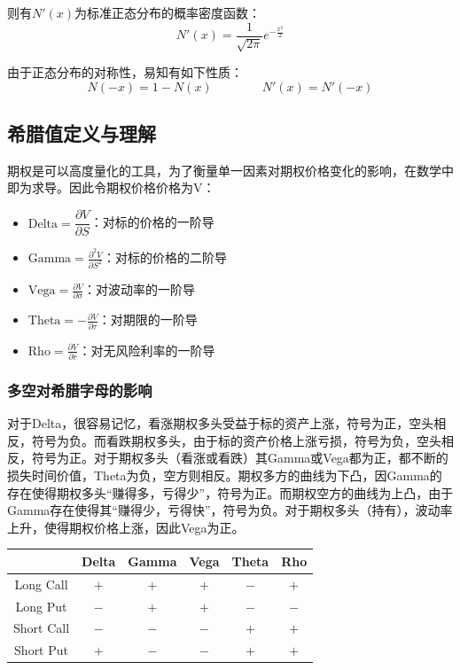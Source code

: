 \documentclass[11pt]{article}
\begin{document}
则有$N'(x)$为标准正态分布的概率密度函数：
\begin{equation*}
    N'(x) = \frac{1}{\sqrt{2\pi}} e^{-\frac{x^2}{2}}
\end{equation*}

由于正态分布的对称性，易知有如下性质：
\begin{equation*}
    N(-x) = 1-N(x) \qquad \qquad
    N'(x) = N'(-x)
\end{equation*}

\subsection{希腊值定义与理解}

期权是可以高度量化的工具，为了衡量单一因素对期权价格变化的影响，在数学中即为求导。因此令期权价格价格为V：
\begin{itemize}
    \item $\text{Delta} = \dfrac{\partial V}{\partial S}$：对标的价格的一阶导
    \item $\text{Gamma}  = \frac{\partial^2 V}{\partial S^2}$：对标的价格的二阶导
    \item $\text{Vega} = \frac{\partial V}{\partial\sigma}$：对波动率的一阶导
    \item $\text{Theta} = -\frac{\partial V}{\partial \tau}$：对期限的一阶导
    \item $\text{Rho} = \frac{\partial V}{\partial r}$：对无风险利率的一阶导
\end{itemize}

\subsubsection{多空对希腊字母的影响}

对于Delta，很容易记忆，看涨期权多头受益于标的资产上涨，符号为正，空头相反，符号为负。而看跌期权多头，由于标的资产价格上涨亏损，符号为负，空头相反，符号为正。对于期权多头（看涨或看跌）其Gamma或Vega都为正，都不断的损失时间价值，Theta为负，空方则相反。期权多方的曲线为下凸，因Gamma的存在使得期权多头“赚得多，亏得少”，符号为正。而期权空方的曲线为上凸，由于Gamma存在使得其“赚得少，亏得快”，符号为负。对于期权多头（持有），波动率上升，使得期权价格上涨，因此Vega为正。
\begin{table}[H]
\centering
\begin{tabular}{@{}cccccc@{}} \toprule
           & Delta & Gamma & Vega & Theta & Rho \\ \midrule
Long Call  & $+$ & $+$ & $+$ & $-$ & $+$ \\
Long Put   & $-$ & $+$ & $+$ & $-$ & $-$ \\
Short Call & $-$ & $-$ & $-$ & $+$ & $+$ \\
Short Put  & $+$ & $-$ & $-$ & $+$ & $+$ \\ \bottomrule
\end{tabular}
\end{table}
\end{document}
